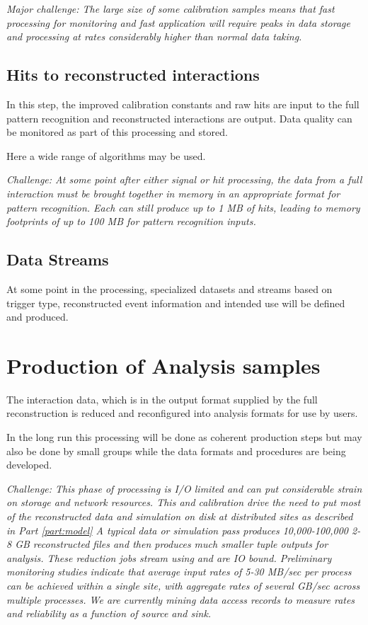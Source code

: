 \documentclass[../main-v1.tex]{subfiles}
\begin{document}
{\it Major challenge: The large size of some calibration samples means that fast processing for monitoring and fast application will require peaks in data storage and processing at rates considerably higher than normal data taking.}

\subsection{Hits to reconstructed interactions }
In this step, the improved calibration constants and raw hits are input to the full  pattern recognition and reconstructed interactions are output. Data quality can be monitored as part of this processing and stored. 

Here a wide range of algorithms may be used. 

{\it Challenge:  At some point after either signal or  hit processing, the data from a full interaction must be brought together in memory in an appropriate format for pattern recognition. Each  can still produce up to 1 MB of hits, leading to memory footprints of up to 100 MB for pattern recognition inputs.}

\subsection{Data Streams}
At some point in the processing, specialized datasets and streams based on trigger type, reconstructed event information and intended use will be defined and produced.

\section{Production of Analysis samples}
The interaction data, which is in the output format supplied by the full reconstruction is reduced and reconfigured into analysis formats for use by users. 

In the long run this processing will be done as coherent production steps but may also be done by small groups while the data formats and procedures are being developed.

{\it Challenge:  This phase of processing is I/O limited and can put considerable strain on storage and network resources.  This and calibration drive the need to put most of the reconstructed data and simulation on disk at distributed sites as described in Part \ref{part:model}
A typical  data or simulation pass produces  10,000-100,000 2-8 GB reconstructed files and  then produces much smaller tuple outputs for analysis.  These reduction jobs stream using  and are IO bound. Preliminary monitoring studies indicate that average input rates of 5-30 MB/sec per process can be achieved within a single site, with aggregate rates of several GB/sec across multiple processes. We are currently mining data access records to measure rates and reliability as a function of source and sink. }
\end{document}

